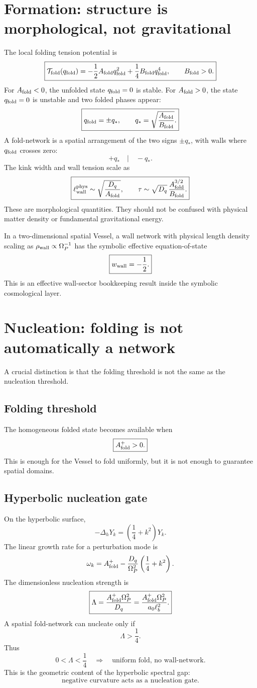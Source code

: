 \documentclass[11pt]{article}
\newcommand{\Op}{\Omega_P}
\newcommand{\qf}{q_{\rm fold}}
\newcommand{\Af}{A_{\rm fold}}
\newcommand{\Bf}{B_{\rm fold}}
\newcommand{\Dq}{D_q}
\newcommand{\Tfold}{\mathcal T_{\rm fold}}
\newcommand{\Lam}{\Lambda}
\theoremstyle{definition}
\theoremstyle{plain}
\begin{document}
\section{Formation: structure is morphological, not gravitational}

The local folding tension potential is
\[
\boxed{
\Tfold(\qf)
=-\frac12\Af\qf^2+\frac14\Bf\qf^4,
\qquad \Bf>0.
}
\]
For $\Af<0$, the unfolded state $\qf=0$ is stable.  For $\Af>0$, the state $\qf=0$ is unstable and two
folded phases appear:
\[
\boxed{
\qf=\pm q_\ast,
\qquad
q_\ast=\sqrt{\frac{\Af}{\Bf}}.
}
\]
A fold-network is a spatial arrangement of the two signs $\pm q_\ast$, with walls where $\qf$ crosses zero:
\[
+q_\ast \quad | \quad -q_\ast.
\]
The kink width and wall tension scale as
\[
\boxed{
\ell_{\rm wall}^{\rm phys}\sim\sqrt{\frac{\Dq}{\Af}},
\qquad
\tau\sim\sqrt{\Dq}\,\frac{\Af^{3/2}}{\Bf}.
}
\]
These are morphological quantities.  They should not be confused with physical matter density or
fundamental gravitational energy.

In a two-dimensional spatial Vessel, a wall network with physical length density scaling as
$\rho_{\rm wall}\propto\Op^{-1}$ has the symbolic effective equation-of-state
\[
\boxed{w_{\rm wall}=-\frac12.}
\]
This is an effective wall-sector bookkeeping result inside the symbolic cosmological layer.

\section{Nucleation: folding is not automatically a network}

A crucial distinction is that the folding threshold is not the same as the nucleation threshold.

\subsection{Folding threshold}
The homogeneous folded state becomes available when
\[
\boxed{\Af^+>0.}
\]
This is enough for the Vessel to fold uniformly, but it is not enough to guarantee spatial domains.

\subsection{Hyperbolic nucleation gate}
On the hyperbolic surface,
\[
-\Delta_hY_k=\left(\frac14+k^2\right)Y_k.
\]
The linear growth rate for a perturbation mode is
\[
\omega_k
=\Af^+-\frac{\Dq}{\Op^2}\left(\frac14+k^2\right).
\]
The dimensionless nucleation strength is
\[
\boxed{
\Lam=\frac{\Af^+\Op^2}{\Dq}
=\frac{\Af^+\Op^2}{a_0\ell_b^2}.
}
\]
A spatial fold-network can nucleate only if
\[
\boxed{\Lam>\frac14.}
\]
Thus
\[
0<\Lam<\frac14
\quad\Rightarrow\quad
\text{uniform fold, no wall-network.}
\]
This is the geometric content of the hyperbolic spectral gap:
\[
\boxed{\text{negative curvature acts as a nucleation gate.}}
\]
\end{document}
